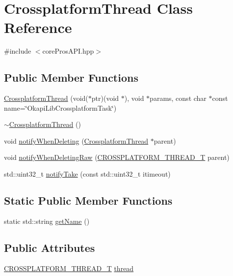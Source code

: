 \hypertarget{classCrossplatformThread}{}\section{Crossplatform\+Thread Class Reference}
\label{classCrossplatformThread}


{\ttfamily \#include $<$core\+Pros\+A\+P\+I.\+hpp$>$}

\subsection*{Public Member Functions}
\begin{DoxyCompactItemize}
\item 
\mbox{\hyperlink{classCrossplatformThread_a21fe128e5e9daa9a892ebefca6f1c4ed}{Crossplatform\+Thread}} (void($\ast$ptr)(void $\ast$), void $\ast$params, const char $\ast$const name=\char`\"{}Okapi\+Lib\+Crossplatform\+Task\char`\"{})
\item 
\mbox{\hyperlink{classCrossplatformThread_a3381be75780fb920e4787d3bfbac0042}{$\sim$\+Crossplatform\+Thread}} ()
\item 
void \mbox{\hyperlink{classCrossplatformThread_a6bce45b009db95074707b96858f63f33}{notify\+When\+Deleting}} (\mbox{\hyperlink{classCrossplatformThread}{Crossplatform\+Thread}} $\ast$parent)
\item 
void \mbox{\hyperlink{classCrossplatformThread_a231ab0d069a7f2dc2dc9f6a2ebe314ab}{notify\+When\+Deleting\+Raw}} (\mbox{\hyperlink{coreProsAPI_8hpp_a1b1c38d4f3c04da38ebb34cb7dec488b}{C\+R\+O\+S\+S\+P\+L\+A\+T\+F\+O\+R\+M\+\_\+\+T\+H\+R\+E\+A\+D\+\_\+T}} parent)
\item 
std\+::uint32\+\_\+t \mbox{\hyperlink{classCrossplatformThread_a1341b0d1b14cf779c5bd47a5a848fdef}{notify\+Take}} (const std\+::uint32\+\_\+t itimeout)
\end{DoxyCompactItemize}
\subsection*{Static Public Member Functions}
\begin{DoxyCompactItemize}
\item 
static std\+::string \mbox{\hyperlink{classCrossplatformThread_ac14c3ade9c664d777c1a1f88abd8ac77}{get\+Name}} ()
\end{DoxyCompactItemize}
\subsection*{Public Attributes}
\begin{DoxyCompactItemize}
\item 
\mbox{\hyperlink{coreProsAPI_8hpp_a1b1c38d4f3c04da38ebb34cb7dec488b}{C\+R\+O\+S\+S\+P\+L\+A\+T\+F\+O\+R\+M\+\_\+\+T\+H\+R\+E\+A\+D\+\_\+T}} \mbox{\hyperlink{classCrossplatformThread_a6717570c6d2ecd9e1750d631594ae206}{thread}}
\end{DoxyCompactItemize}


